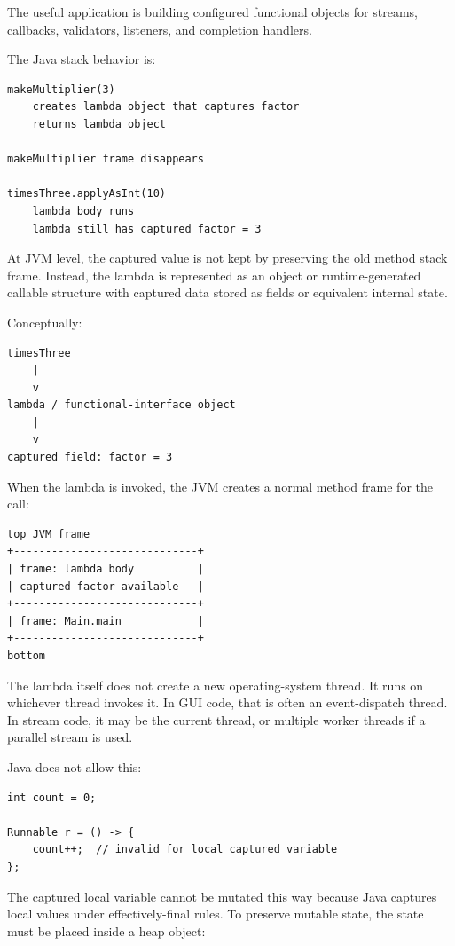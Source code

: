 The useful application is building configured functional objects for streams, callbacks, validators, listeners, and completion handlers.

The Java stack behavior is:

\begin{verbatim}
makeMultiplier(3)
    creates lambda object that captures factor
    returns lambda object

makeMultiplier frame disappears

timesThree.applyAsInt(10)
    lambda body runs
    lambda still has captured factor = 3
\end{verbatim}

At JVM level, the captured value is not kept by preserving the old method stack frame. Instead, the lambda is represented as an object or runtime-generated callable structure with captured data stored as fields or equivalent internal state.

Conceptually:

\begin{verbatim}
timesThree
    |
    v
lambda / functional-interface object
    |
    v
captured field: factor = 3
\end{verbatim}

When the lambda is invoked, the JVM creates a normal method frame for the call:

\begin{verbatim}
top JVM frame
+-----------------------------+
| frame: lambda body          |
| captured factor available   |
+-----------------------------+
| frame: Main.main            |
+-----------------------------+
bottom
\end{verbatim}

The lambda itself does not create a new operating-system thread. It runs on whichever thread invokes it. In GUI code, that is often an event-dispatch thread. In stream code, it may be the current thread, or multiple worker threads if a parallel stream is used.

Java does not allow this:

\begin{verbatim}
int count = 0;

Runnable r = () -> {
    count++;  // invalid for local captured variable
};
\end{verbatim}

The captured local variable cannot be mutated this way because Java captures local values under effectively-final rules. To preserve mutable state, the state must be placed inside a heap object:

